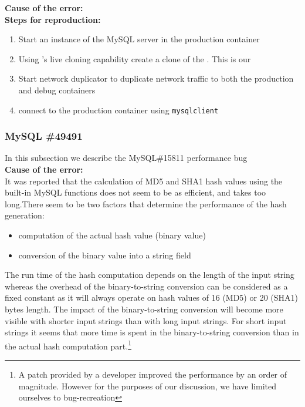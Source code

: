 \noindent \textbf{Cause of the error:} \\

\noindent \textbf{Steps for reproduction:} \\

\begin{adjustwidth}{0.5cm}{}
	\begin{enumerate}
		\item Start an instance of the MySQL server in the production container
		\item Using \parikshan's live cloning capability create a clone of the \productioncontainer. This is our \debugcontainer
		\item Start network duplicator to duplicate network traffic to both the production and debug containers
		\item connect to the production container using \texttt{mysqlclient}
		
	\end{enumerate}
\end{adjustwidth}	


\subsubsection{MySQL \#49491}

In this subsection we describe the MySQL\#15811 performance bug \\

\noindent \textbf{Cause of the error:} \\

It was reported that the calculation of MD5 and SHA1 hash values using the built-in MySQL functions does not seem to be as efficient, and takes too long.There seem to be two factors that determine the performance of the hash generation:
\begin{itemize}
	\item computation of the actual hash value (binary value)
	\item conversion of the binary value into a string field
\end{itemize}

The run time of the hash computation depends on the length of the input string whereas the overhead of the binary-to-string conversion can be considered as a fixed constant as it will always operate on hash values of 16 (MD5) or 20 (SHA1) bytes length.
The impact of the binary-to-string conversion will become more visible with shorter input strings than with long input strings. For short input strings it seems that more time is spent in the binary-to-string conversion than in the actual hash computation part.\footnote{A patch provided by a developer improved the performance by an order of magnitude. However for the purposes of our discussion, we have limited ourselves to bug-recreation}

